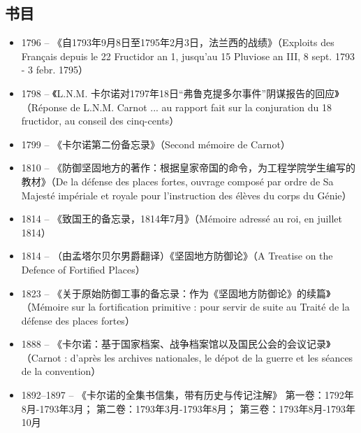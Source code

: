 \subsection{书目}  
\begin{itemize}
\item 1796 – 《自1793年9月8日至1795年2月3日，法兰西的战绩》（Exploits des Français depuis le 22 Fructidor an 1, jusqu'au 15 Pluviose an III, 8 sept. 1793 - 3 febr. 1795）  
\item 1798 – 《L.N.M. 卡尔诺对1797年18日“弗鲁克提多尔事件”阴谋报告的回应》（Réponse de L.N.M. Carnot ... au rapport fait sur la conjuration du 18 fructidor, au conseil des cinq-cents）  
\item 1799 – 《卡尔诺第二份备忘录》（Second mémoire de Carnot）  
\item 1810 – 《防御坚固地方的著作：根据皇家帝国的命令，为工程学院学生编写的教材》（De la défense des places fortes, ouvrage composé par ordre de Sa Majesté impériale et royale pour l'instruction des élèves du corps du Génie）  
\item 1814 – 《致国王的备忘录，1814年7月》（Mémoire adressé au roi, en juillet 1814）  
\item 1814 – （由孟塔尔贝尔男爵翻译）《坚固地方防御论》（A Treatise on the Defence of Fortified Places）  
\item 1823 – 《关于原始防御工事的备忘录：作为《坚固地方防御论》的续篇》（Mémoire sur la fortification primitive : pour servir de suite au Traité de la défense des places fortes）  
\item 1888 – 《卡尔诺：基于国家档案、战争档案馆以及国民公会的会议记录》（Carnot : d'après les archives nationales, le dépot de la guerre et les séances de la convention）  
\item 1892–1897 – 《卡尔诺的全集书信集，带有历史与传记注解》  
第一卷：1792年8月-1793年3月；  
第二卷：1793年3月-1793年8月；  
第三卷：1793年8月-1793年10月
\end{itemize}
